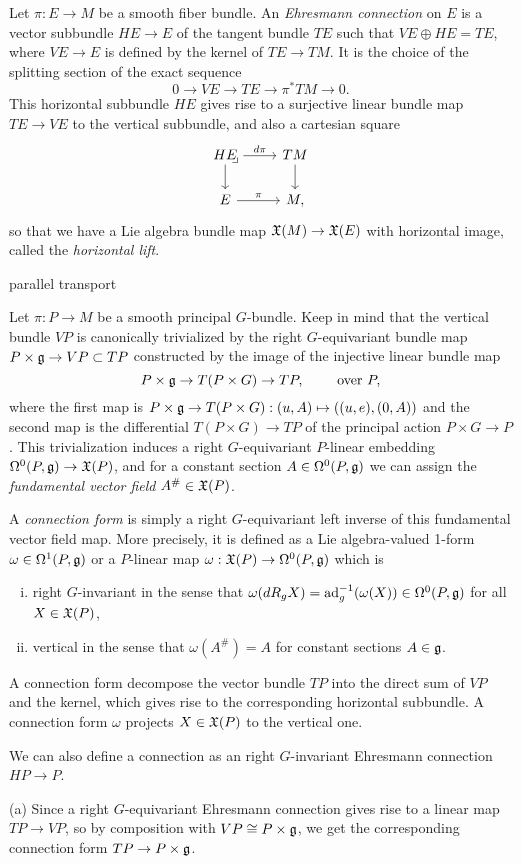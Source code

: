 \documentclass{../../large}
\begin{document}
\begin{prb}
Let $\pi:E\to M$ be a smooth fiber bundle.
An \emph{Ehresmann connection} on $E$ is a vector subbundle $HE\to E$ of the tangent bundle $TE$ such that $VE\oplus HE=TE$, where $VE\to E$ is defined by the kernel of $TE\to TM$.
It is the choice of the splitting section of the exact sequence
\[0\to VE\to TE\to\pi^*TM\to0.\]
This horizontal subbundle $HE$ gives rise to a surjective linear bundle map $TE\to VE$ to the vertical subbundle, and also a cartesian square
\[\begin{tikzcd}
HE \rar{d\pi}\dar\pullback & TM\dar\\
E \rar{\pi} & M,
\end{tikzcd}\]
so that we have a Lie algebra bundle map $\mathfrak{X}(M)\to\mathfrak{X}(E)$ with horizontal image, called the \emph{horizontal lift}.

parallel transport
\end{prb}

\begin{prb}
Let $\pi:P\to M$ be a smooth principal $G$-bundle.
Keep in mind that the vertical bundle $VP$ is canonically trivialized by the right $G$-equivariant bundle map $P\times\mathfrak{g}\to VP\subset TP$ constructed by the image of the injective linear bundle map
\[P\times\mathfrak{g}\to T(P\times G)\to TP,\qquad\text{ over }P,\]
where the first map is $P\times\mathfrak{g}\to T(P\times G):(u,A)\mapsto((u,e),(0,A))$ and the second map is the differential $T(P\times G)\to TP$ of the principal action $P\times G\to P$.
This trivialization induces a right $G$-equivariant $P$-linear embedding $\Omega^0(P,\mathfrak{g})\to\mathfrak{X}(P)$, and for a constant section $A\in\Omega^0(P,\mathfrak{g})$ we can assign the \emph{fundamental vector field} $A^\#\in\mathfrak{X}(P)$.

A \emph{connection form} is simply a right $G$-equivariant left inverse of this fundamental vector field map.
More precisely, it is defined as a Lie algebra-valued 1-form $\omega\in\Omega^1(P,\mathfrak{g})$ or a $P$-linear map $\omega:\mathfrak{X}(P)\to\Omega^0(P,\mathfrak{g})$ which is
\begin{enumerate}[(i)]
\item right $G$-invariant in the sense that $\omega(dR_gX)=\operatorname{ad}_g^{-1}(\omega(X))\in\Omega^0(P,\mathfrak{g})$ for all $X\in\mathfrak{X}(P)$,
\item vertical in the sense that $\omega(A^\#)=A$ for constant sections $A\in\mathfrak{g}$.
\end{enumerate}
A connection form decompose the vector bundle $TP$ into the direct sum of $VP$ and the kernel, which gives rise to the corresponding horizontal subbundle.
A connection form $\omega$ projects $X\in\mathfrak{X}(P)$ to the vertical one.
\begin{parts}
\item We can also define a connection as an right $G$-invariant Ehresmann connection $HP\to P$.

\end{parts}
\end{prb}
\begin{pf}
(a)
Since a right $G$-equivariant Ehresmann connection gives rise to a linear map $TP\to VP$, so by composition with $VP\cong P\times \mathfrak{g}$, we get the corresponding connection form $TP\to P\times\mathfrak{g}$.
\end{pf}
\end{document}
